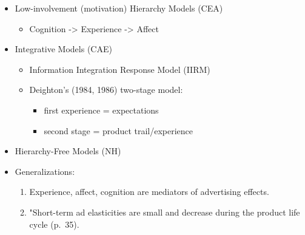 \documentclass[
]{book}
\providecommand{\tightlist}{%
  \setlength{\itemsep}{0pt}\setlength{\parskip}{0pt}}
\begin{document}
\begin{itemize}
  \begin{itemize}
  \item
    Cognition -\textgreater{} Affect -\textgreater{} behavior. (CA)
  \item
    Elaboration Likelihood Model (ELM): \citep{petty1986}
  \item
    Another model is \citep{maclnnis1989}
  \item
    Fishbein-Ajzen (1975) involvement model
  \item
    Batra and Ray (1985): Utilitarian and hedonic effect on attitudes towards the brand
  \item
    Involvement moderates the effect of ad evaluation (persuasion is found in low-involvement consumers with attitude towards the ad).
  \item
    Little support for CA model, but the authors still believe in it.
  \end{itemize}
\item
  Low-involvement (motivation) Hierarchy Models (CEA)

  \begin{itemize}
  \tightlist
  \item
    Cognition -\textgreater{} Experience -\textgreater{} Affect
  \end{itemize}
\item
  Integrative Models (CAE)

  \begin{itemize}
  \item
    Information Integration Response Model (IIRM)
  \item
    Deighton's (1984, 1986) two-stage model:

    \begin{itemize}
    \item
      first experience = expectations
    \item
      second stage = product trail/experience
    \end{itemize}
  \end{itemize}
\item
  Hierarchy-Free Models (NH)
\item
  Generalizations:

  \begin{enumerate}
  \def\labelenumi{\arabic{enumi}.}
  \item
    Experience, affect, cognition are mediators of advertising effects.
  \item
    "Short-term ad elasticities are small and decrease during the product life cycle (p.~35).
  \end{enumerate}
\end{itemize}
\end{document}
